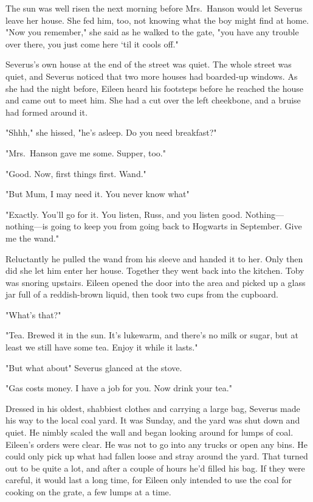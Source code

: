 The sun was well risen the next morning before Mrs.~Hanson would let Severus leave her house. She fed him, too, not knowing what the boy might find at home. "Now you remember," she said as he walked to the gate, "you have any trouble over there, you just come here `til it cools off."

Severus's own house at the end of the street was quiet. The whole street was quiet, and Severus noticed that two more houses had boarded-up windows. As she had the night before, Eileen heard his footsteps before he reached the house and came out to meet him. She had a cut over the left cheekbone, and a bruise had formed around it.

"Shhh," she hissed, "he's asleep. Do you need breakfast?"

"Mrs.~Hanson gave me some. Supper, too."

"Good. Now, first things first. Wand."

"But Mum, I may need it. You never know what{\el}"

"Exactly. You'll go for it. You listen, Russ, and you listen good. Nothing—nothing—is going to keep you from going back to Hogwarts in September. Give me the wand."

Reluctantly he pulled the wand from his sleeve and handed it to her. Only then did she let him enter her house. Together they went back into the kitchen. Toby was snoring upstairs. Eileen opened the door into the area and picked up a glass jar full of a reddish-brown liquid, then took two cups from the cupboard.

"What's that?"

"Tea. Brewed it in the sun. It's lukewarm, and there's no milk or sugar, but at least we still have some tea. Enjoy it while it lasts."

"But what about{\el}" Severus glanced at the stove.

"Gas costs money. I have a job for you. Now drink your tea."

Dressed in his oldest, shabbiest clothes and carrying a large bag, Severus made his way to the local coal yard. It was Sunday, and the yard was shut down and quiet. He nimbly scaled the wall and began looking around for lumps of coal. Eileen's orders were clear. He was not to go into any trucks or open any bins. He could only pick up what had fallen loose and stray around the yard. That turned out to be quite a lot, and after a couple of hours he'd filled his bag. If they were careful, it would last a long time, for Eileen only intended to use the coal for cooking on the grate, a few lumps at a time.

